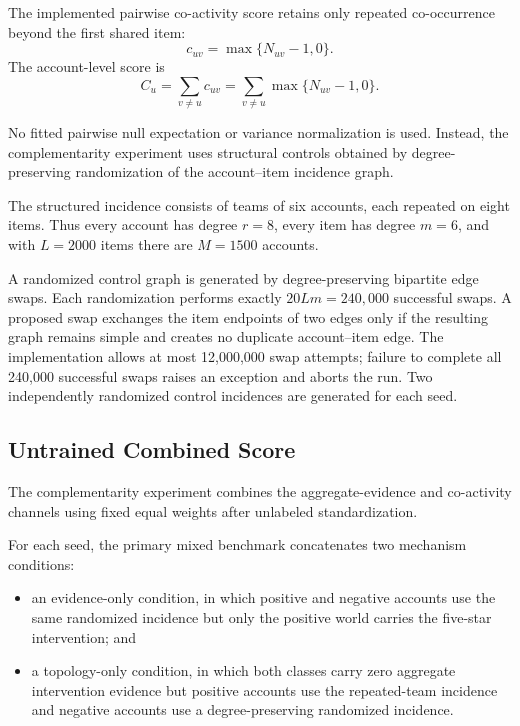 The implemented pairwise co-activity score retains only repeated
co-occurrence beyond the first shared item:
\begin{equation}
\label{eq:supp-pair-coactivity}
c_{uv}
=
\max\{N_{uv}-1,0\}.
\end{equation}
The account-level score is
\begin{equation}
\label{eq:supp-account-coactivity}
C_u
=
\sum_{v\neq u}c_{uv}
=
\sum_{v\neq u}\max\{N_{uv}-1,0\}.
\end{equation}

No fitted pairwise null expectation or variance normalization is used.
Instead, the complementarity experiment uses structural controls obtained by
degree-preserving randomization of the account--item incidence graph.

The structured incidence consists of teams of six accounts, each repeated on
eight items. Thus every account has degree $r=8$, every item has degree
$m=6$, and with $L=2000$ items there are $M=1500$ accounts.

A randomized control graph is generated by degree-preserving bipartite edge
swaps. Each randomization performs exactly
$20Lm=240{,}000$ successful swaps. A proposed swap exchanges the item
endpoints of two edges only if the resulting graph remains simple and creates
no duplicate account--item edge. The implementation allows at most
12,000,000 swap attempts; failure to complete all 240,000 successful swaps
raises an exception and aborts the run. Two independently randomized control
incidences are generated for each seed.



\subsection{Untrained Combined Score}
\label{sec:supp-combination}

The complementarity experiment combines the aggregate-evidence and
co-activity channels using fixed equal weights after unlabeled
standardization.

For each seed, the primary mixed benchmark concatenates two mechanism
conditions:
\begin{itemize}
    \item an evidence-only condition, in which positive and negative accounts
          use the same randomized incidence but only the positive world carries
          the five-star intervention; and
    \item a topology-only condition, in which both classes carry zero aggregate
          intervention evidence but positive accounts use the repeated-team
          incidence and negative accounts use a degree-preserving randomized
          incidence.
\end{itemize}

